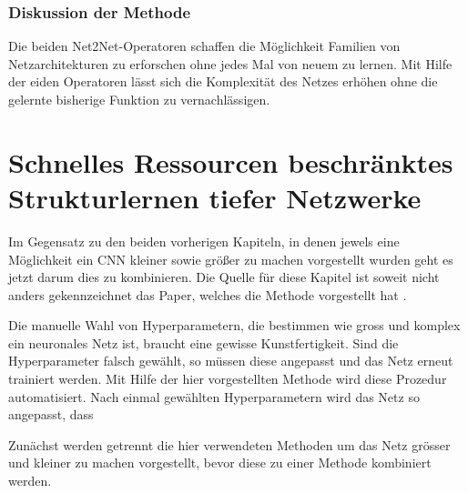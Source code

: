 \subsubsection{Diskussion der Methode}

Die beiden Net2Net-Operatoren schaffen die Möglichkeit Familien von Netzarchitekturen zu erforschen ohne jedes Mal von neuem zu lernen. Mit Hilfe der eiden Operatoren lässt sich die Komplexität des Netzes erhöhen ohne die gelernte bisherige Funktion zu vernachlässigen.


\section{Schnelles Ressourcen beschränktes Strukturlernen tiefer Netzwerke}
Im Gegensatz zu den beiden vorherigen Kapiteln, in denen jewels eine Möglichkeit ein CNN kleiner sowie größer zu machen vorgestellt wurden geht es jetzt darum dies zu kombinieren. Die Quelle für diese Kapitel ist soweit nicht anders gekennzeichnet  das Paper, welches die Methode vorgestellt hat \cite{morphnet}.

Die manuelle Wahl von Hyperparametern, die bestimmen wie gross und komplex ein neuronales Netz ist, braucht eine gewisse Kunstfertigkeit. Sind die Hyperparameter falsch gewählt, so müssen diese angepasst und das Netz erneut trainiert werden. Mit Hilfe der hier vorgestellten Methode wird diese Prozedur automatisiert. Nach einmal gewählten Hyperparametern wird das Netz so angepasst, dass 


Zunächst werden getrennt die hier verwendeten Methoden um das Netz grösser und kleiner zu machen vorgestellt, bevor diese zu einer Methode kombiniert werden.

